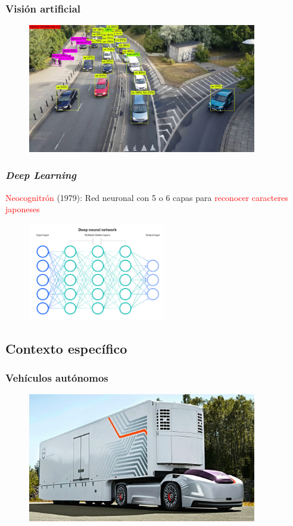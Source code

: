 \documentclass{beamer}
\begin{document}
\begin{frame}
	\frametitle{Visión artificial}
	\begin{figure}
		\centering
		\includegraphics[width=10cm]{figs/yolo}
	\end{figure}
\end{frame}

\begin{frame}
	\frametitle{\textit{Deep Learning}}
	\begin{outline}
		\1 \textcolor{red}{Neocognitrón} (1979): Red neuronal con 5 o 6 capas para \textcolor{red}{reconocer caracteres japoneses}
	\end{outline}
	\begin{figure}
		\centering
		\includegraphics[width=6cm]{figs/neuralnetwork}
	\end{figure}
\end{frame}

\subsection{Contexto específico}
\begin{frame}
	\frametitle{Vehículos autónomos}
	\begin{figure}
		\centering
		\includegraphics[width=10cm]{figs/volvovera}
	\end{figure}
\end{frame}
\end{document}
